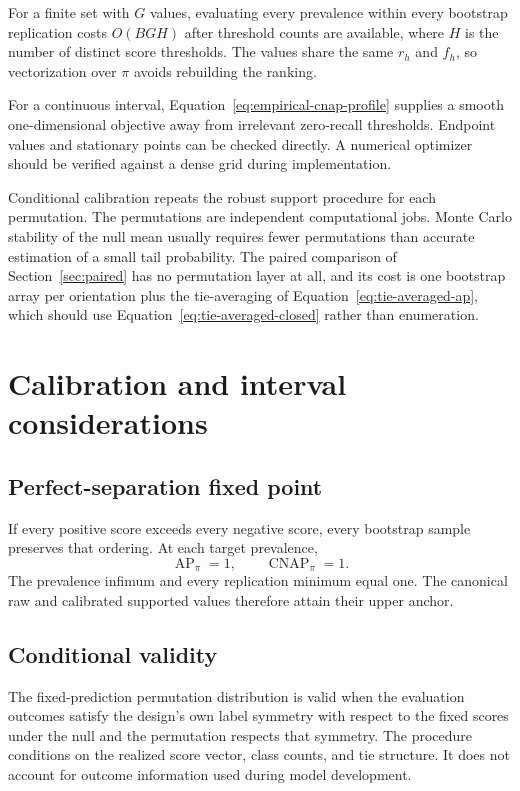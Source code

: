 \documentclass[11pt]{article}
\newcommand{\AP}{\operatorname{AP}}
\newcommand{\CNAP}{\operatorname{CNAP}}
\theoremstyle{remark}
\begin{document}
For a finite set with $G$ values, evaluating every prevalence within every bootstrap replication costs $O(BGH)$ after threshold counts are available, where $H$ is the number of distinct score thresholds. The values share the same $r_h$ and $f_h$, so vectorization over $\pi$ avoids rebuilding the ranking.

For a continuous interval, Equation~\eqref{eq:empirical-cnap-profile} supplies a smooth one-dimensional objective away from irrelevant zero-recall thresholds. Endpoint values and stationary points can be checked directly. A numerical optimizer should be verified against a dense grid during implementation.

Conditional calibration repeats the robust support procedure for each permutation. The permutations are independent computational jobs. Monte Carlo stability of the null mean usually requires fewer permutations than accurate estimation of a small tail probability. The paired comparison of Section~\ref{sec:paired} has no permutation layer at all, and its cost is one bootstrap array per orientation plus the tie-averaging of Equation~\eqref{eq:tie-averaged-ap}, which should use Equation~\eqref{eq:tie-averaged-closed} rather than enumeration.

\section{Calibration and interval considerations}
\label{app:calibration}

\subsection{Perfect-separation fixed point}

If every positive score exceeds every negative score, every bootstrap sample preserves that ordering. At each target prevalence,
\[
\AP_\pi=1,
\qquad
\CNAP_\pi=1.
\]
The prevalence infimum and every replication minimum equal one. The canonical raw and calibrated supported values therefore attain their upper anchor.

\subsection{Conditional validity}

The fixed-prediction permutation distribution is valid when the evaluation outcomes satisfy the design's own label symmetry with respect to the fixed scores under the null and the permutation respects that symmetry. The procedure conditions on the realized score vector, class counts, and tie structure. It does not account for outcome information used during model development.
\end{document}
